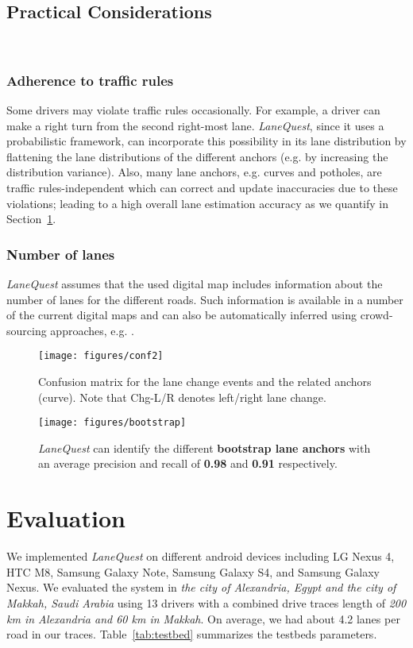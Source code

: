 \documentclass[10pt, conference, compsocconf]{IEEEtran}
\def \sys {\textit{LaneQuest}}
\newcommand{\figscale}{0.7}
\begin{document}
\subsection{Practical Considerations}~\label{sec:discuss}
\subsubsection{Adherence to traffic rules}
Some drivers may violate traffic rules occasionally. For example, a driver can make a right turn from the second right-most lane. \sys{}, since it uses a probabilistic framework, can incorporate this possibility in its lane distribution by flattening the lane distributions of the different anchors (e.g. by increasing the distribution variance). Also, many lane anchors, e.g. curves and potholes, are traffic rules-independent which can correct and update inaccuracies due to these violations; leading to a high overall lane estimation accuracy as we quantify in Section~\ref{sec:eval}.
\subsubsection{Number of lanes}
\sys{} assumes that the used digital map includes information about the number of lanes for the different roads. Such information is available in a number of the current digital maps  and can also be automatically inferred using crowd-sourcing approaches, e.g. \cite{chen2010probabilistic}.
\begin{figure}[!t]
\centering
\texttt{[image: figures/conf2]}
\caption{Confusion matrix for the lane change events and the related anchors (curve).   Note that Chg-L/R denotes left/right lane change.}
\label{fig:dyn_conf}
\end{figure}
 \begin{figure}[!t]
\centering
\texttt{[image: figures/bootstrap]}
\caption{\sys{} can identify the different \textbf{bootstrap lane anchors} with an average precision and recall of \textbf{0.98} and \textbf{0.91} respectively.}
\label{fig:anchor_det_boot}
\end{figure}



\section{Evaluation}\label{sec:eval}

We implemented \sys{} on different android devices including LG Nexus 4, HTC M8, Samsung Galaxy Note, Samsung Galaxy S4, and Samsung Galaxy Nexus. We evaluated the system in \emph{the city of Alexandria, Egypt and the city of Makkah, Saudi Arabia} using 13 drivers with a combined drive traces length of \emph{200 km in Alexandria and 60 km in Makkah}. On average, we had about 4.2 lanes per road in our traces. Table~\ref{tab:testbed} summarizes the testbeds parameters.
\end{document}
